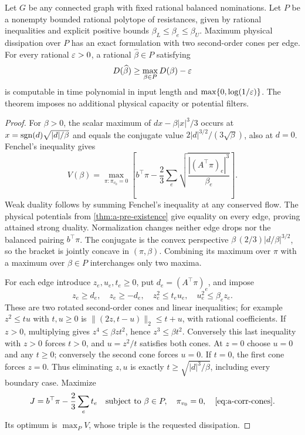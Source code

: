 \begin{theorem}
\label{thm:a-corr-energy-max}
Let $G$ be any connected graph with fixed rational balanced nominations.
Let $P$ be a nonempty bounded rational polytope of resistances, given by
rational inequalities and explicit positive bounds
$\beta_L\le\beta_e\le\beta_U$. Maximum physical dissipation over $P$
has an exact formulation with two second-order cones per edge.
For every rational $\varepsilon>0$, a rational $\widehat\beta\in P$ satisfying
\[
 D(\widehat\beta)\ge\max_{\beta\in P}D(\beta)-\varepsilon
\]
is computable in time polynomial in input length and
$\max\{0,\log(1/\varepsilon)\}$. The theorem imposes no additional physical
capacity or potential filters.
\end{theorem}
\begin{proof}
For $\beta>0$, the scalar maximum of
$dx-\beta|x|^3/3$ occurs at
$x=\operatorname{sgn}(d)\sqrt{|d|/\beta}$ and equals the conjugate value
$2|d|^{3/2}/(3\sqrt\beta)$, also at $d=0$. Fenchel's inequality gives
\begin{equation}
 V(\beta)=\max_{\pi:\pi_{v_0}=0}
 \left[b^\top\pi-\frac23\sum_e
     \sqrt{\frac{|(A^\top\pi)_e|^3}{\beta_e}}\right].
 \label{eq:a-corr-dual}
\end{equation}
Weak duality follows by summing Fenchel's inequality at any conserved
flow. The physical potentials from
\cref{thm:a-pre-existence} give equality on every edge, proving attained
strong duality. Normalization changes neither edge drops nor the balanced
pairing $b^\top\pi$. The conjugate is the convex perspective
$\beta\, (2/3)|d/\beta|^{3/2}$, so the bracket is jointly concave in
$(\pi,\beta)$. Combining its maximum over $\pi$ with a maximum over
$\beta\in P$ interchanges only two maxima.

For each edge introduce $z_e,u_e,t_e\ge0$, put
$d_e=(A^\top\pi)_e$, and impose
\begin{equation}
 z_e\ge d_e,\quad z_e\ge-d_e,\quad
 z_e^2\le t_eu_e,\quad u_e^2\le\beta_e z_e.
 \label{eq:a-corr-cones}
\end{equation}
These are two rotated second-order cones and linear inequalities;
for example $z^2\le tu$ with $t,u\ge0$ is
$\|(2z,t-u)\|_2\le t+u$, with rational coefficients.
If $z>0$, multiplying gives $z^4\le\beta zt^2$, hence
$z^3\le\beta t^2$. Conversely this last inequality with $z>0$
forces $t>0$, and $u=z^2/t$ satisfies both cones. At $z=0$ choose
$u=0$ and any $t\ge0$; conversely the second cone forces $u=0$.
If $t=0$, the first cone forces $z=0$. Thus eliminating $z,u$ is
exactly $t\ge\sqrt{|d|^3/\beta}$, including every boundary case.
Maximize
\begin{equation}
 J=b^\top\pi-\frac23\sum_e t_e
 \quad\hbox{subject to }\beta\in P,\quad\pi_{v_0}=0,
 \quad\cref{eq:a-corr-cones}.
 \label{eq:a-corr-socp}
\end{equation}
Its optimum is $\max_P V$, whose triple is the requested dissipation.


\end{proof}
